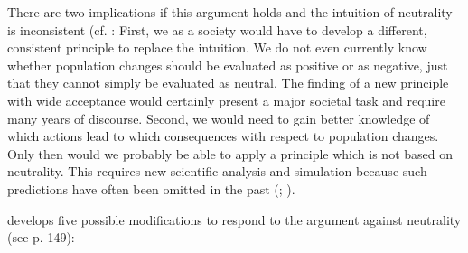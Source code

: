 There are two implications if this argument holds and the intuition of neutrality is inconsistent (cf. : First, we as a society would have to develop a different, consistent principle to replace the intuition. We do not even currently know whether population changes should be evaluated as positive or as negative, just that they cannot simply be evaluated as neutral. The finding of a new principle with wide acceptance would certainly present a major societal task and require many years of discourse. Second, we would need to gain better knowledge of which actions lead to which consequences with respect to population changes. Only then would we probably be able to apply a principle which is not based on neutrality. This requires new scientific analysis and simulation because such predictions have often been omitted in the past (; ). 

 develops five possible modifications to respond to the argument against neutrality (see p. 149):  

